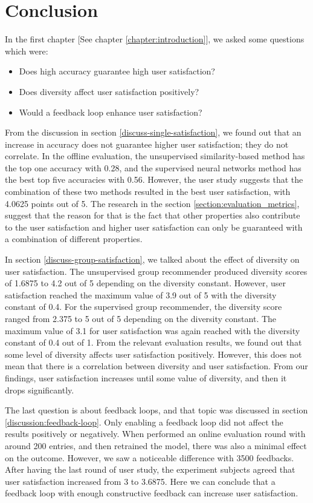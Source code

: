 
\chapter{Conclusion}\label{chapter:conclusion}

In the first chapter [See chapter \ref{chapter:introduction}], we asked some questions which were: 


\begin{itemize}
	\item Does high accuracy guarantee high user satisfaction?
	\item Does diversity affect user satisfaction positively?
	\item Would a feedback loop enhance user satisfaction?
\end{itemize}


From the discussion in section \ref{discuss-single-satisfaction}, we found out that an increase in accuracy does not guarantee higher user satisfaction; they do not correlate. In the offline evaluation, the unsupervised similarity-based method has the top one accuracy with 0.28, and the supervised neural networks method has the best top five accuracies with 0.56. However, the user study suggests that the combination of these two methods resulted in the best user satisfaction, with 4.0625 points out of 5. The research in the section \ref{section:evaluation_metrics}, suggest that the reason for that is the fact that other properties also contribute to the user satisfaction and higher user satisfaction can only be guaranteed with a combination of different properties.


In section \ref{discuss-group-satisfaction}, we talked about the effect of diversity on user satisfaction. The unsupervised group recommender produced diversity scores of 1.6875 to 4.2 out of 5 depending on the diversity constant. However, user satisfaction reached the maximum value of 3.9 out of 5 with the diversity constant of 0.4. For the supervised group recommender, the diversity score ranged from 2.375 to 5 out of 5 depending on the diversity constant. The maximum value of 3.1 for user satisfaction was again reached with the diversity constant of 0.4 out of 1. From the relevant evaluation results, we found out that some level of diversity affects user satisfaction positively. However, this does not mean that there is a correlation between diversity and user satisfaction. From our findings, user satisfaction increases until some value of diversity, and then it drops significantly.


The last question is about feedback loops, and that topic was discussed in section \ref{discussion:feedback-loop}. Only enabling a feedback loop did not affect the results positively or negatively. When performed an online evaluation round with around 200 entries, and then retrained the model, there was also a minimal effect on the outcome. However, we saw a noticeable difference with 3500 feedbacks. After having the last round of user study, the experiment subjects agreed that user satisfaction increased from 3 to 3.6875. Here we can conclude that a feedback loop with enough constructive feedback can increase user satisfaction.
